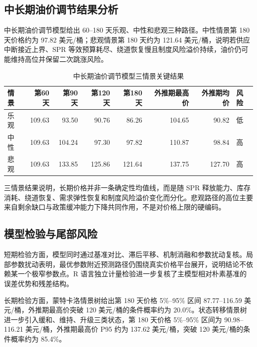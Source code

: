 \subsection{中长期油价调节结果分析}

中长期油价调节模型给出 60--180 天乐观、中性和悲观三种路径。中性情景第 180 天价格约为 97.82 美元/桶；悲观情景第 180 天约为 121.64 美元/桶，说明若供应中断接近上界、SPR 等效预算耗尽、绕道恢复慢且制度风险溢价持续，油价仍可能维持高位并保留二次跳涨风险。

\begin{table}[!htbp]
\centering
\caption{中长期油价调节模型三情景关键结果}
\begin{tabular}{lrrrrrrl}
\toprule
情景 & 第60天 & 第90天 & 第120天 & 第180天 & 外推期最高价 & 外推期均价 & 风险 \\
\midrule
乐观 & 109.63 & 93.50 & 90.76 & 86.26 & 104.65 & 90.82 & 低 \\
中性 & 109.63 & 104.24 & 97.30 & 97.82 & 110.87 & 98.84 & 高 \\
悲观 & 109.63 & 133.85 & 125.86 & 121.64 & 137.75 & 127.70 & 高 \\
\bottomrule
\end{tabular}
\end{table}

三情景结果说明，长期价格并非一条确定性均值线，而是随 SPR 释放能力、库存消耗、绕道恢复、需求弹性恢复和制度风险溢价变化而分化。悲观路径的高位主要来自剩余缺口与政策缓冲能力下降共同作用，不是对价格上限的硬编码。

\subsection{模型检验与尾部风险}

短期检验方面，模型同时通过基准对比、滞后平移、机制消融和参数扰动复核。局部参数扰动表明，最优参数附近预测路径仍围绕真实价格平台展开，说明结论不依赖某一个极窄参数点。R 语言独立计量检验进一步复核了主模型相对朴素基准的误差优势和残差结构。

长期检验方面，蒙特卡洛情景树给出第 180 天价格 5\%--95\% 区间 87.77--116.59 美元/桶，外推期最高价突破 120 美元/桶的条件概率约为 20.0\%。状态转移情景树进一步引入缓和、维持、升级三类状态，第 180 天价格 5\%--95\% 区间为 90.98--116.21 美元/桶，外推期最高价 P95 约为 137.62 美元/桶，突破 120 美元/桶的条件概率约为 85.4\%。

